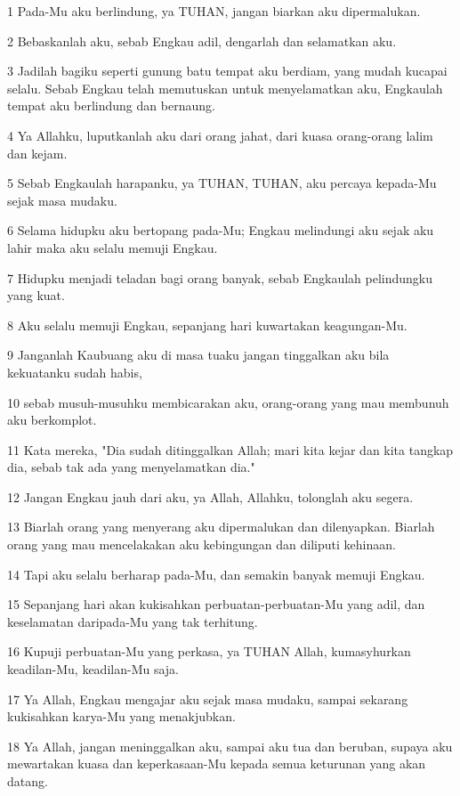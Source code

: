 \par 1 Pada-Mu aku berlindung, ya TUHAN, jangan biarkan aku dipermalukan.
\par 2 Bebaskanlah aku, sebab Engkau adil, dengarlah dan selamatkan aku.
\par 3 Jadilah bagiku seperti gunung batu tempat aku berdiam, yang mudah kucapai selalu. Sebab Engkau telah memutuskan untuk menyelamatkan aku, Engkaulah tempat aku berlindung dan bernaung.
\par 4 Ya Allahku, luputkanlah aku dari orang jahat, dari kuasa orang-orang lalim dan kejam.
\par 5 Sebab Engkaulah harapanku, ya TUHAN, TUHAN, aku percaya kepada-Mu sejak masa mudaku.
\par 6 Selama hidupku aku bertopang pada-Mu; Engkau melindungi aku sejak aku lahir maka aku selalu memuji Engkau.
\par 7 Hidupku menjadi teladan bagi orang banyak, sebab Engkaulah pelindungku yang kuat.
\par 8 Aku selalu memuji Engkau, sepanjang hari kuwartakan keagungan-Mu.
\par 9 Janganlah Kaubuang aku di masa tuaku jangan tinggalkan aku bila kekuatanku sudah habis,
\par 10 sebab musuh-musuhku membicarakan aku, orang-orang yang mau membunuh aku berkomplot.
\par 11 Kata mereka, "Dia sudah ditinggalkan Allah; mari kita kejar dan kita tangkap dia, sebab tak ada yang menyelamatkan dia."
\par 12 Jangan Engkau jauh dari aku, ya Allah, Allahku, tolonglah aku segera.
\par 13 Biarlah orang yang menyerang aku dipermalukan dan dilenyapkan. Biarlah orang yang mau mencelakakan aku kebingungan dan diliputi kehinaan.
\par 14 Tapi aku selalu berharap pada-Mu, dan semakin banyak memuji Engkau.
\par 15 Sepanjang hari akan kukisahkan perbuatan-perbuatan-Mu yang adil, dan keselamatan daripada-Mu yang tak terhitung.
\par 16 Kupuji perbuatan-Mu yang perkasa, ya TUHAN Allah, kumasyhurkan keadilan-Mu, keadilan-Mu saja.
\par 17 Ya Allah, Engkau mengajar aku sejak masa mudaku, sampai sekarang kukisahkan karya-Mu yang menakjubkan.
\par 18 Ya Allah, jangan meninggalkan aku, sampai aku tua dan beruban, supaya aku mewartakan kuasa dan keperkasaan-Mu kepada semua keturunan yang akan datang.
